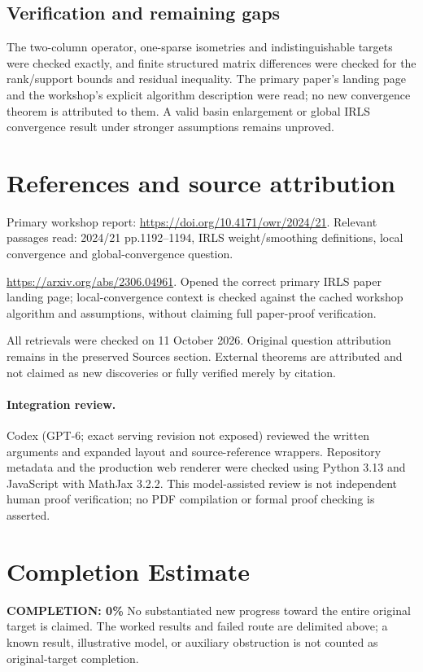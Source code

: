 \documentclass[11pt]{article}
\begin{document}
\subsection{Verification and remaining gaps}
The two-column operator, one-sparse isometries and indistinguishable targets were checked exactly, and finite structured matrix differences were checked for the rank/support bounds and residual inequality. The primary paper's landing page and the workshop's explicit algorithm description were read; no new convergence theorem is attributed to them. A valid basin enlargement or global IRLS convergence result under stronger assumptions remains unproved.

\section{References and source attribution}
Primary workshop report: \url{https://doi.org/10.4171/owr/2024/21}. Relevant passages read: 2024/21 pp.1192--1194, IRLS weight/smoothing definitions, local convergence and global-convergence question.

\url{https://arxiv.org/abs/2306.04961}. Opened the correct primary IRLS paper landing page; local-convergence context is checked against the cached workshop algorithm and assumptions, without claiming full paper-proof verification.

All retrievals were checked on 11 October 2026. Original question attribution remains in the preserved Sources section. External theorems are attributed and not claimed as new discoveries or fully verified merely by citation.


\paragraph{Integration review.} Codex (GPT-6; exact serving revision not exposed) reviewed the written arguments and expanded layout and source-reference wrappers. Repository metadata and the production web renderer were checked using Python 3.13 and JavaScript with MathJax 3.2.2. This model-assisted review is not independent human proof verification; no PDF compilation or formal proof checking is asserted.

\section{Completion Estimate}
\noindent\textbf{COMPLETION: 0\%}
No substantiated new progress toward the entire original target is claimed. The worked results and failed route are delimited above; a known result, illustrative model, or auxiliary obstruction is not counted as original-target completion.
\end{document}
